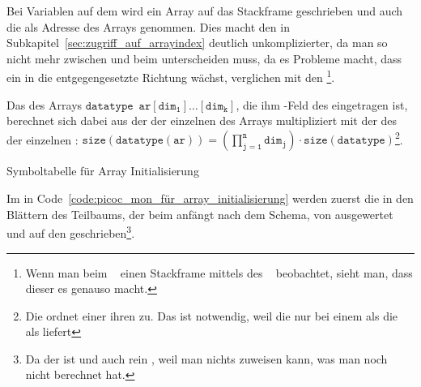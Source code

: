 Bei Variablen auf dem  wird ein Array  auf das Stackframe geschrieben und auch die  als Adresse des Arrays genommen. Dies macht den  in Subkapitel~\ref{sec:zugriff_auf_arrayindex} deutlich unkomplizierter, da man so nicht mehr zwischen  und  beim  unterscheiden muss, da es Probleme macht, dass ein  in die entgegengesetzte Richtung wächst, verglichen mit den \footnote{Wenn man beim ~\cite{noauthor_gcc_nodate} einen Stackframe mittels des ~\cite{noauthor_gcc_nodate} beobachtet, sieht man, dass dieser es genauso macht.}.

\begin{Special_Paragraph}
  Das  des Arrays $\mathtt{datatype \enspace ar[dim_1]\ldots[dim_k]}$, die ihm -Feld des  eingetragen ist, berechnet sich dabei aus der  der einzelnen  des Arrays multipliziert mit der  des  der einzelnen : $\mathtt{size(datatype(ar)) = \left(\prod^n_{j=1} dim_j\right)\cdot size(datatype)}$\footnote{Die    ordnet einer   ihren  zu. Das ist notwendig, weil die   nur bei einem  als  die  als  liefert}.
\end{Special_Paragraph}

\begin{code}
  \centering
  \caption{Symboltabelle für Array Initialisierung}
  \label{code:symboltabelle_für_array_initialisierung}
\end{code}

Im  in Code~\ref{code:picoc_mon_für_array_initialisierung} werden zuerst die  in den Blättern des Teilbaums, der beim    anfängt nach dem  Schema, von  ausgewertet und auf den  geschrieben\footnote{Da der  \smalltt{=}  ist und auch rein , weil man nichts zuweisen kann, was man noch nicht berechnet hat.}.


